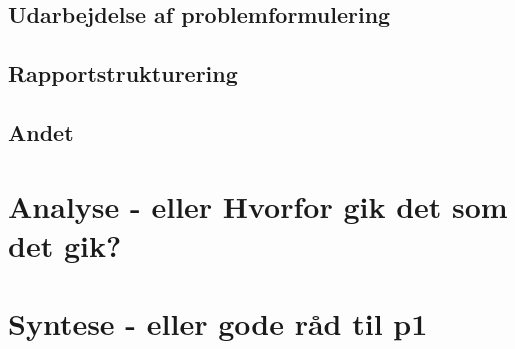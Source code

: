 \subsection{Udarbejdelse af problemformulering}



\subsection{Rapportstrukturering}

\subsection{Andet}

\section{Analyse - eller Hvorfor gik det som det gik?}



\section{Syntese - eller gode råd til p1}









